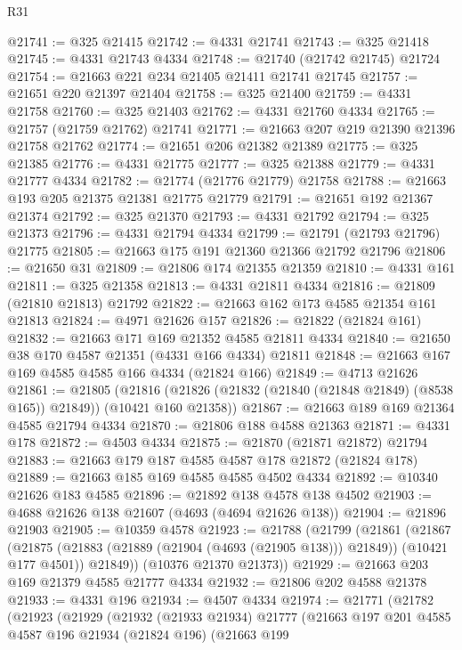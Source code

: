 \begin{lexlean}{R31}
\begin{coremodule}
@21741 := @325 @21415
@21742 := @4331 @21741
@21743 := @325 @21418
@21745 := @4331 @21743 @4334
@21748 := @21740 (@21742 @21745) @21724
@21754 := @21663 @221 @234 @21405 @21411 @21741 @21745
@21757 := @21651 @220 @21397 @21404
@21758 := @325 @21400
@21759 := @4331 @21758
@21760 := @325 @21403
@21762 := @4331 @21760 @4334
@21765 := @21757 (@21759 @21762) @21741
@21771 := @21663 @207 @219 @21390 @21396 @21758 @21762
@21774 := @21651 @206 @21382 @21389
@21775 := @325 @21385
@21776 := @4331 @21775
@21777 := @325 @21388
@21779 := @4331 @21777 @4334
@21782 := @21774 (@21776 @21779) @21758
@21788 := @21663 @193 @205 @21375 @21381 @21775 @21779
@21791 := @21651 @192 @21367 @21374
@21792 := @325 @21370
@21793 := @4331 @21792
@21794 := @325 @21373
@21796 := @4331 @21794 @4334
@21799 := @21791 (@21793 @21796) @21775
@21805 := @21663 @175 @191 @21360 @21366 @21792 @21796
@21806 := @21650 @31
@21809 := @21806 @174 @21355 @21359
@21810 := @4331 @161
@21811 := @325 @21358
@21813 := @4331 @21811 @4334
@21816 := @21809 (@21810 @21813) @21792
@21822 := @21663 @162 @173 @4585 @21354 @161 @21813
@21824 := @4971 @21626 @157
@21826 := @21822 (@21824 @161)
@21832 := @21663 @171 @169 @21352 @4585 @21811 @4334
@21840 := @21650 @38 @170 @4587 @21351 (@4331 @166 @4334) @21811
@21848 := @21663 @167 @169 @4585 @4585 @166 @4334 (@21824 @166)
@21849 := @4713 @21626
@21861 := @21805
    (@21816 (@21826 (@21832 (@21840 (@21848 @21849) (@8538 @165)) @21849)) (@10421 @160 @21358))
@21867 := @21663 @189 @169 @21364 @4585 @21794 @4334
@21870 := @21806 @188 @4588 @21363
@21871 := @4331 @178
@21872 := @4503 @4334
@21875 := @21870 (@21871 @21872) @21794
@21883 := @21663 @179 @187 @4585 @4587 @178 @21872 (@21824 @178)
@21889 := @21663 @185 @169 @4585 @4585 @4502 @4334
@21892 := @10340 @21626 @183 @4585
@21896 := @21892 @138 @4578 @138 @4502
@21903 := @4688 @21626 @138 @21607 (@4693 (@4694 @21626 @138))
@21904 := @21896 @21903
@21905 := @10359 @4578
@21923 := @21788
    (@21799
      (@21861
        (@21867
          (@21875 (@21883 (@21889 (@21904 (@4693 (@21905 @138))) @21849)) (@10421 @177 @4501))
          @21849))
      (@10376 @21370 @21373))
@21929 := @21663 @203 @169 @21379 @4585 @21777 @4334
@21932 := @21806 @202 @4588 @21378
@21933 := @4331 @196
@21934 := @4507 @4334
@21974 := @21771
    (@21782
      (@21923
        (@21929
          (@21932
            (@21933 @21934)
            @21777
            (@21663
              @197
              @201
              @4585
              @4587
              @196
              @21934
              (@21824 @196)
              (@21663
                @199

\end{coremodule}
\end{lexlean}

